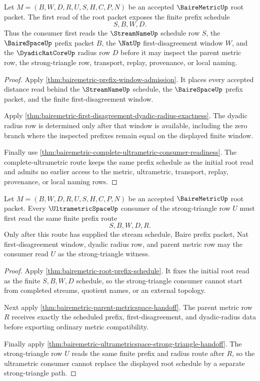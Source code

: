 \begin{theorem}
\label{thm:bairemetric-root-prefix-schedule}
Let $M=(B,W,D,R,U,S,H,C,P,N)$ be an accepted $\BaireMetricUp$ root packet. The first read of the root packet exposes the finite prefix schedule
$$
S,B,W,D .
$$
Thus the consumer first reads the $\StreamNameUp$ schedule row $S$, the $\BaireSpaceUp$ prefix packet $B$, the $\NatUp$ first-disagreement window $W$, and the $\DyadicRatCoreUp$ radius row $D$ before it may inspect the parent metric row, the strong-triangle row, transport, replay, provenance, or local naming.
\end{theorem}
\begin{proof}
Apply \autoref{thm:bairemetric-prefix-window-admission}. It places every accepted distance read behind the $\StreamNameUp$ schedule, the $\BaireSpaceUp$ prefix packet, and the finite first-disagreement window.

Apply \autoref{thm:bairemetric-first-disagreement-dyadic-radius-exactness}. The dyadic radius row is determined only after that window is available, including the zero branch where the inspected prefixes remain equal on the displayed finite window.

Finally use \autoref{thm:bairemetric-complete-ultrametric-consumer-readiness}. The complete-ultrametric route keeps the same prefix schedule as the initial root read and admits no earlier access to the metric, ultrametric, transport, replay, provenance, or local naming rows.
\end{proof}

\begin{theorem}
\label{thm:bairemetric-root-strong-triangle-route}
Let $M=(B,W,D,R,U,S,H,C,P,N)$ be an accepted $\BaireMetricUp$ root packet. Every $\UltrametricSpaceUp$ consumer of the strong-triangle row $U$ must first read the same finite prefix route
$$
S,B,W,D,R .
$$
Only after this route has supplied the stream schedule, Baire prefix packet, Nat first-disagreement window, dyadic radius row, and parent metric row may the consumer read $U$ as the strong-triangle witness.
\end{theorem}
\begin{proof}
Apply \autoref{thm:bairemetric-root-prefix-schedule}. It fixes the initial root read as the finite $S,B,W,D$ schedule, so the strong-triangle consumer cannot start from completed streams, quotient names, or an external topology.

Next apply \autoref{thm:bairemetric-parent-metricspace-handoff}. The parent metric row $R$ receives exactly the scheduled prefix, first-disagreement, and dyadic-radius data before exporting ordinary metric compatibility.

Finally apply \autoref{thm:bairemetric-ultrametricspace-strong-triangle-handoff}. The strong-triangle row $U$ reads the same finite prefix and radius route after $R$, so the ultrametric consumer cannot replace the displayed root schedule by a separate strong-triangle path.
\end{proof}

